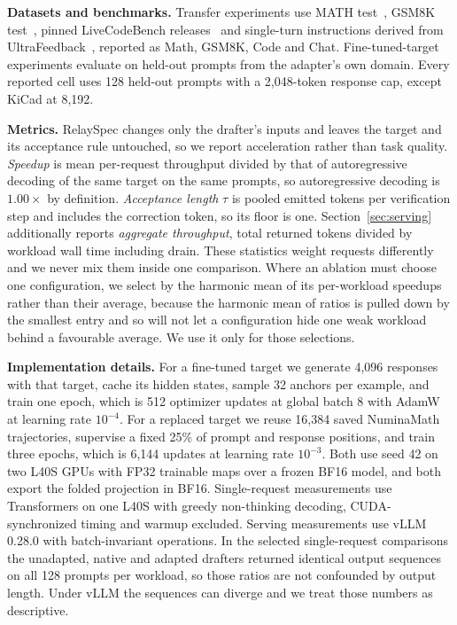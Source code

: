 \textbf{Datasets and benchmarks.} Transfer experiments use MATH test~\citep{hendrycks2021math}, GSM8K test~\citep{cobbe2021gsm8k}, pinned LiveCodeBench releases~\citep{jain2024livecodebench} and single-turn instructions derived from UltraFeedback~\citep{cui2024ultrafeedback}, reported as Math, GSM8K, Code and Chat. Fine-tuned-target experiments evaluate on held-out prompts from the adapter's own domain. Every reported cell uses 128 held-out prompts with a 2{,}048-token response cap, except KiCad at 8{,}192.

\textbf{Metrics.} RelaySpec changes only the drafter's inputs and leaves the target and its acceptance rule untouched, so we report acceleration rather than task quality. \emph{Speedup} is mean per-request throughput divided by that of autoregressive decoding of the same target on the same prompts, so autoregressive decoding is $1.00\times$ by definition. \emph{Acceptance length} $\tau$ is pooled emitted tokens per verification step and includes the correction token, so its floor is one. Section~\ref{sec:serving} additionally reports \emph{aggregate throughput}, total returned tokens divided by workload wall time including drain. These statistics weight requests differently and we never mix them inside one comparison. Where an ablation must choose one configuration, we select by the harmonic mean of its per-workload speedups rather than their average, because the harmonic mean of ratios is pulled down by the smallest entry and so will not let a configuration hide one weak workload behind a favourable average. We use it only for those selections.

\textbf{Implementation details.} For a fine-tuned target we generate 4{,}096 responses with that target, cache its hidden states, sample 32 anchors per example, and train one epoch, which is 512 optimizer updates at global batch 8 with AdamW at learning rate $10^{-4}$. For a replaced target we reuse 16{,}384 saved NuminaMath~\citep{li2024numinamath} trajectories, supervise a fixed 25\% of prompt and response positions, and train three epochs, which is 6{,}144 updates at learning rate $10^{-3}$. Both use seed 42 on two L40S GPUs with FP32 trainable maps over a frozen BF16 model, and both export the folded projection in BF16. Single-request measurements use Transformers on one L40S with greedy non-thinking decoding, CUDA-synchronized timing and warmup excluded. Serving measurements use vLLM 0.28.0 with batch-invariant operations. In the selected single-request comparisons the unadapted, native and adapted drafters returned identical output sequences on all 128 prompts per workload, so those ratios are not confounded by output length. Under vLLM the sequences can diverge and we treat those numbers as descriptive.


